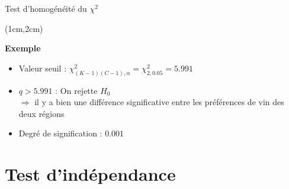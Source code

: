\documentclass{beamer}
\begin{document}
\begin{frame}{Test d'homogénéité du $\chi^2$}
\begin{textblock*}{\textwidth}(1cm,2cm)

\begin{center}{\bf \Large Exemple} \end{center}

\small 
\begin{itemize}
\item Valeur seuil : $\chi^2_{(K-1)(C-1),\alpha} = \chi^2_{2,0.05} = 5.991$ \\

\item $q>5.991$ : On rejette $H_0$ \\
$\Rightarrow$ il y a bien une différence significative entre les préférences de vin des deux régions

\item Degré de signification : $0.001$
\end{itemize}


\end{textblock*}

\end{frame}

\section{Test d'indépendance} 

\end{document}
